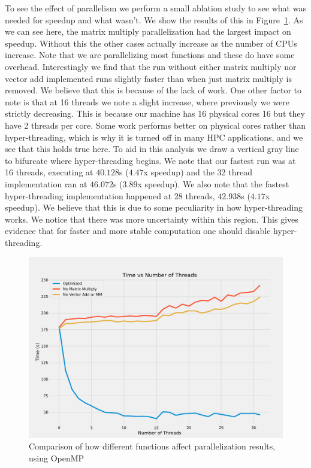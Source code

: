 To see the effect of parallelism we perform a small ablation study to see what
was needed for speedup and what wasn't. We show the results of this in
Figure~\ref{fig:omp}. As we can see here, the matrix multiply parallelization
had the largest impact on speedup. Without this the other cases actually
increase as the number of CPUs increase. Note that we are parallelizing most
functions and these do have some overhead. Interestingly we find that the run
without either matrix multiply nor vector add implemented runs slightly faster
than when just matrix multiply is removed. We believe that this is because of
the lack of work. One other factor to note is that at 16 threads we note a
slight increase, where previously we were strictly decreasing. This is because
our machine has 16 physical cores 16 but they have 2 threads per core. Some work
performs better on physical cores rather than hyper-threading, which is why it
is turned off in many HPC applications, and we see that this holds true here. To
aid in this analysis we draw a vertical gray line to bifurcate where
hyper-threading begins. We
note that our fastest run was at 16 threads, executing at $40.128$s ($4.47$x
speedup) and the 32 thread implementation ran at $46.072$s ($3.89$x speedup). We
also note that the fastest hyper-threading implementation happened at 28
threads, $42.938$s ($4.17$x speedup). We believe that this is due to some
peculiarity in how hyper-threading works. We notice that there was more
uncertainty within this region. This gives evidence that for faster and more
stable computation one should disable hyper-threading.

\begin{figure}[ht]
\centering
\includegraphics[width=\linewidth]{omp.png}
\caption{Comparison of how different functions affect parallelization results,
    using OpenMP}
    \label{fig:omp}
\end{figure}

